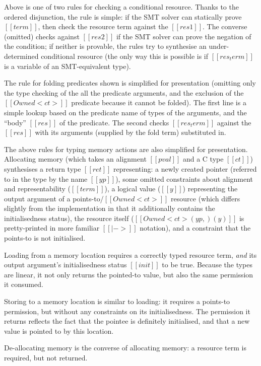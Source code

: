\documentclass[11pt]{article}%
\begin{document}
Above is one of two rules for checking a conditional resource.
Thanks to the ordered disjunction, the rule is simple: if the SMT
solver can statically prove $[[ term ]]$, then check the
resource term against the $[[ res1 ]]$. The converse (omitted) checks against
$[[ res2 ]]$ if the SMT solver can prove the negation of the condition; if
neither is provable, the rules try to synthesise an under-determined
conditional resource (the only way this is possible is if $[[ res_term ]]$ is a
variable of an SMT-equivalent type).

The rule for folding predicates shown is simplified for presentation (omitting
only the type checking of the all the predicate arguments, and the exclusion of
the $[[ Owned < ct > ]]$ predicate because it cannot be folded). The first line
is a simple lookup based on the predicate name of types of the arguments, and
the ``body'' $[[ res ]]$ of the predicate. The second checks $[[ res_term ]]$
against the $[[ res ]]$ with its arguments (supplied by the fold term)
substituted in.

The above rules for typing memory actions are also simplified for
presentation.  Allocating memory (which takes an alignment $[[ pval ]]$ and a C
type $[[ ct ]]$) synthesises a return type $[[ ret ]]$ representing: a newly
created pointer (referred to in the type by the name $[[ yp ]]$), some omitted
constraints about alignment and representability ($[[ term ]]$), a logical
value ($[[ y ]]$) representing the output argument of a points-to/$[[ Owned< ct
> ]]$ resource (which differs slightly from the implementation in that it
additionally contains the initialisedness status), the resource itself
($[[ Owned <ct> ( yp , ) ( y ) ]]$ is pretty-printed in more familiar $[[ |-> ]]$
notation), and a constraint that the points-to is not initialised.

Loading from a memory location requires a correctly typed resource term,
\emph{and} its output argument's initialisedness status $[[ init ]]$ to be
true. Because the types are linear, it not only returns the pointed-to value,
but also the same permission it consumed.

Storing to a memory location is similar to loading: it requires a points-to permission,
but without any constraints on its initialisedness. The permission it returns
reflects the fact that the pointee is definitely initialised, and that a new
value is pointed to by this location.

De-allocating memory is the converse of allocating memory: a resource term is
required, but not returned.
\end{document}
